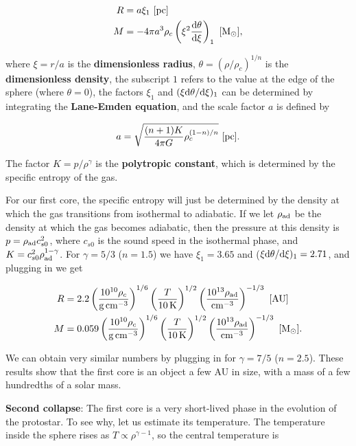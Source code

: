 \documentclass[a4paper,10pt]{article}
\begin{document}
\begin{align*}
    R &= a\xi_1 ~ [{\rm pc}]\\
    M &= -4\pi a^3\rho_c \left(\xi^2\frac{{\rm d}\theta}{{\rm d}\xi}\right)_1 ~ [{\rm M_\odot}],
\end{align*}

{\noindent}where $\xi=r/a$ is the \textbf{dimensionless radius}, $\theta=(\rho/\rho_c)^{1/n}$ is the \textbf{dimensionless density}, the subscript $1$ refers to the value at the edge of the sphere (where $\theta=0$), the factors $\xi_1$ and $(\xi{\rm d}\theta/{\rm d}\xi)_1$ can be determined by integrating the \textbf{Lane-Emden equation}, and the scale factor $a$ is defined by

\begin{align*}
    a = \sqrt{\frac{(n+1)K}{4\pi G}\rho_c^{(1-n)/n}} ~ [{\rm pc}].
\end{align*}

{\noindent}The factor $K=p/\rho^\gamma$ is the \textbf{polytropic constant}, which is determined by the specific entropy of the gas.

{\noindent}For our first core, the specific entropy will just be determined by the density at which the gas transitions from isothermal to adiabatic. If we let $\rho_{\rm ad}$ be the density at which the gas becomes adiabatic, then the pressure at this density is $p=\rho_{\rm ad}c_{s0}^2$, where $c_{s0}$ is the sound speed in the isothermal phase, and $K=c_{s0}^2\rho_{\rm ad}^{1-\gamma}$. For $\gamma=5/3$ ($n=1.5$) we have $\xi_1=3.65$ and ($\xi{\rm d}\theta/{\rm d}\xi)_1=2.71$, and plugging in we get

\begin{align*}
    R &= 2.2 \left(\frac{10^{10}\rho_c}{{\rm g\,cm^{-3}}}\right)^{1/6} \left(\frac{T}{10\,{\rm K}}\right)^{1/2} \left(\frac{10^{13}\rho_{\rm ad}}{{\rm cm^{-3}}}\right)^{-1/3} ~ [{\rm AU}] \\
    M &= 0.059 \left(\frac{10^{10}\rho_c}{{\rm g\,cm^{-3}}}\right)^{1/6} \left(\frac{T}{10\,{\rm K}}\right)^{1/2} \left(\frac{10^{13}\rho_{\rm ad}}{{\rm cm^{-3}}}\right)^{-1/3} ~ [{\rm M_\odot}].
\end{align*}

{\noindent}We can obtain very similar numbers by plugging in for $\gamma=7/5$ ($n=2.5$). These results show that the first core is an object a few AU in size, with a mass of a few hundredths of a solar mass.

{\noindent}\textbf{Second collapse}: The first core is a very short-lived phase in the evolution of the protostar. To see why, let us estimate its temperature. The temperature inside the sphere rises as $T\propto\rho^{\gamma-1}$, so the central temperature is
\end{document}
